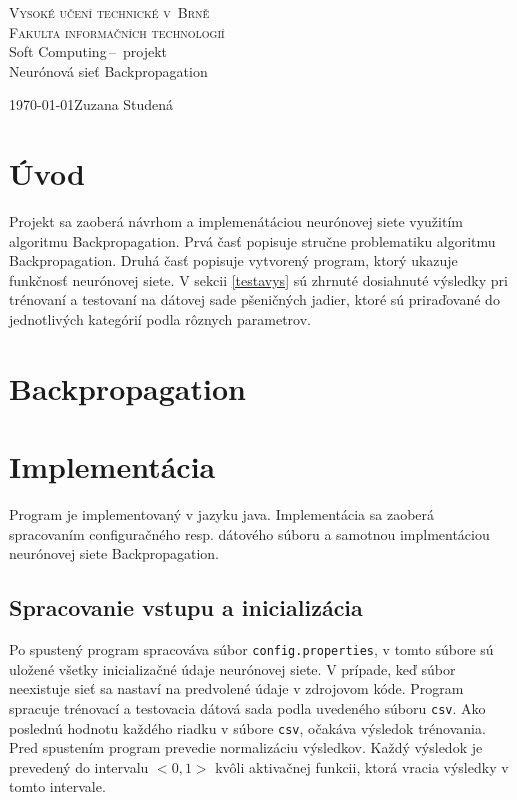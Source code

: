 \documentclass[a4paper, 11pt]{article}
\begin{document}
\begin{titlepage}
\begin{center}
\textsc{\Huge{Vysoké učení technické v~Brně}\\
\medskip
\huge {Fakulta informačních technologií}}\\
\LARGE{Soft Computing\,--\ projekt}\\
\Huge{Neurónová sieť Backpropagation }
\end{center}
{\Large \today \hfill Zuzana Studená}
\end{titlepage}

\newpage

\section{Úvod}
Projekt sa zaoberá návrhom a implemenátáciou neurónovej siete využitím algoritmu Backpropagation. Prvá časť popisuje stručne problematiku algoritmu Backpropagation. Druhá časť popisuje vytvorený program, ktorý ukazuje funkčnosť neurónovej siete. V sekcii \ref{testavys} sú zhrnuté dosiahnuté výsledky pri trénovaní a testovaní na dátovej sade pšeničných jadier, ktoré sú priraďované do jednotlivých kategórií podla rôznych parametrov.

\section{Backpropagation}

\section{Implementácia}
Program je implementovaný v jazyku java. Implementácia sa zaoberá spracovaním configuračného resp. dátového súboru a samotnou implmentáciou neurónovej siete Backpropagation.  
\subsection{Spracovanie vstupu a inicializácia}
Po spustený program spracováva súbor \texttt{config.properties}, v tomto súbore sú uložené všetky inicializačné údaje neurónovej siete. V prípade, keď súbor neexistuje sieť sa nastaví na predvolené údaje v zdrojovom kóde. Program spracuje trénovací a testovacia dátová sada podla uvedeného súboru \texttt{csv}. Ako poslednú hodnotu každého riadku v súbore \texttt{csv}, očakáva výsledok trénovania. Pred spustením program prevedie normalizáciu výsledkov. Každý výsledok je prevedený do intervalu $<0,1>$ kvôli aktivačnej funkcii, ktorá vracia výsledky v tomto intervale. 
\end{document}
